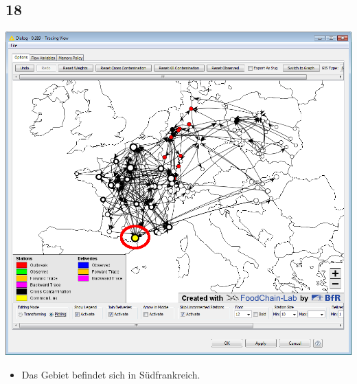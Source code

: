 \documentclass{beamer}
\begin{document}
\subsection{18}
\begin{frame}
	\begin{center}
  		\includegraphics[height=0.6\textheight]{18.png}
	\end{center}
	\begin{itemize}
		\item Das Gebiet befindet sich in Südfrankreich.
	\end{itemize}
\end{frame}
\end{document}
